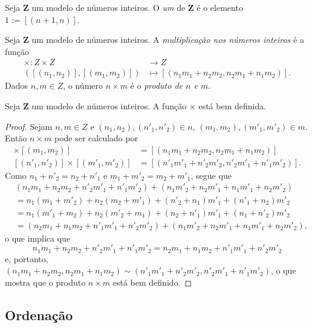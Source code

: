 \begin{defi}
	Seja $\bm Z$ um modelo de números inteiros. O \emph{um} de $\bm Z$ é o elemento $1 := [(n+1,n)]$.
\end{defi}

\begin{defi}
Seja $\bm Z$ um modelo de números inteiros. A \emph{multiplicação nos números inteiros} é a função
	\begin{align*}
	\times : Z \times Z &\to Z \\
		([(n_1,n_2)],[(m_1,m_2)]) &\mapsto [(n_1 m_1 + n_2 m_2,n_2 m_1+n_1 m_2)].
	\end{align*}
Dados $n,m \in Z$, o número $n \times m$ é o \emph{produto de $n$ e $m$}.
\end{defi}

\begin{teo}
	Seja $\bm Z$ um modelo de números inteiros. A função $\times$ está bem definida.
\end{teo}
\begin{proof}
	Sejam $n,m \in Z$ e $(n_1,n_2),(n'_1,n'_2) \in n$, $(m_1,m_2),(m'_1,m'_2) \in m$. Então $n \times m$ pode ser calculado por
\begin{align*}
	[(n_1,n_2)] \times [(m_1,m_2)] &= [(n_1 m_1 + n_2 m_2,n_2 m_1+n_1 m_2)] \\
	[(n'_1,n'_2)]\times [(m'_1,m'_2)] &= [(n'_1 m'_1 + n'_2 m'_2,n'_2 m'_1+n'_1 m'_2)].
	\end{align*}
Como $n_1+n'_2=n_2+n'_1$ e $m_1+m'_2=m_2+m'_1$, segue que
	\begin{align*}
	&(n_1 m_1 + n_2 m_2+n'_2 m'_1+n'_1 m'_2)+(n_1 m'_2 + n_2 m'_1 + n_1 m'_1+n_2 m'_2) \\
	&= n_1(m_1+m'_2)+n_2(m_2+m'_1)+(n'_2+n_1)m'_1+(n'_1+n_2)m'_2 \\
	&= n_1(m'_1+m_2)+n_2(m'_2+m_1)+(n_2+n'_1)m'_1+(n_1+n'_2)m'_2 \\
	&= (n_2 m_1+n_1 m_2+n'_1 m'_1 + n'_2 m'_2)+(n_1 m'_2 + n_2 m'_1 + n_1 m'_1+n_2 m'_2),
	\end{align*}
o que implica que
	\begin{equation*}
	n_1 m_1 + n_2 m_2+n'_2 m'_1+n'_1 m'_2=n_2 m_1+n_1 m_2+n'_1 m'_1 + n'_2 m'_2
	\end{equation*}
e, portanto, $(n_1 m_1 + n_2 m_2,n_2 m_1+n_1 m_2) \sim (n'_1 m'_1 + n'_2 m'_2,n'_2 m'_1+n'_1 m'_2)$, o que mostra que o produto $n \times m$ está bem definido.
\end{proof}

\subsection{Ordenação}

